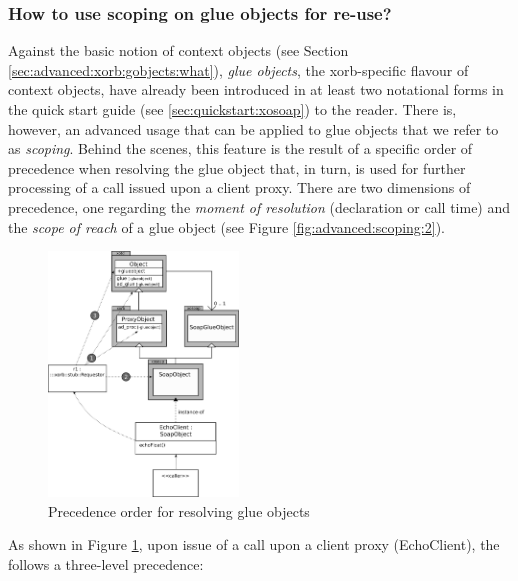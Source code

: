   \subsubsection{How to use scoping on glue objects for re-use?}\label{sec:advanced:xorb:gobjects:why}
  Against the basic notion of context objects (see Section \ref{sec:advanced:xorb:gobjects:what}), \emph{glue objects}, the xorb-specific flavour of context objects, have already been introduced in at least two notational forms in the quick start guide (see \ref{sec:quickstart:xosoap}) to the reader. There is, however, an advanced usage that can be applied to glue objects that we refer to as \emph{scoping}. Behind the scenes, this feature is the result of a specific order of precedence when resolving the glue object that, in turn, is used for further processing of a call issued upon a client proxy. There are two dimensions of precedence, one regarding the \emph{moment of resolution} (declaration or call time) and the \emph{scope of reach} of a glue object (see Figure \ref{fig:advanced:scoping:2}).
  \begin{figure}[htbp]
\begin{center}
\includegraphics[width=0.45\textwidth]{img/scoping-glue-objects-structure.png}
\caption{Precedence order for resolving glue objects}
\label{fig:advanced:scoping:1}
\end{center}
\end{figure}
As shown in Figure \ref{fig:advanced:scoping:1}, upon issue of a call upon a client proxy (EchoClient), the  follows a three-level precedence:
